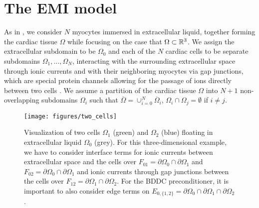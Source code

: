 \section{The EMI model} \label{sec:emi}
As in \cite{2D-proof}, we consider $N$ myocytes immersed in extracellular liquid, together forming the cardiac tissue $\Omega$ while focusing on the case that $\Omega \subset \mathbb{R}^3$. We assign the extracellular subdomain to be $\Omega_0$ and each of the $N$ cardiac cells to be separate subdomains $\Omega_1,\dots,\Omega_N$, interacting with the surrounding extracellular space through ionic currents and with their neighboring myocytes via gap junctions, which are special protein channels allowing for the passage of ions directly between two cells \cite{ionic}. We assume a partition of the cardiac tissue $\Omega$ into $N + 1$ non-overlapping subdomains $\Omega_i$ such that $\overline \Omega = \cup_{i = 0}^N \overline \Omega_i$, $\Omega_i \cap \Omega_j = \emptyset$ if $i \neq j$.

\begin{figure}
    \centering
    \texttt{[image: figures/two\_cells]}
    \caption{Visualization of two cells $\Omega_1$ (green) and $\Omega_2$ (blue) floating in extracellular liquid $\Omega_0$ (grey). For this three-dimensional example, we have to consider interface terms for ionic currents between extracellular space and the cells over $F_{01} = \partial\Omega_0 \cap \partial\Omega_1$ and $F_{02} = \partial \Omega_0 \cap \partial \Omega_1$ and ionic currents through gap junctions between the cells over $F_{12} = \partial\Omega_1\cap\partial\Omega_2$. For the BDDC preconditioner, it is important to also consider edge terms on $E_{0, \{1, 2\}} = \partial\Omega_0\cap\partial\Omega_1\cap\partial\Omega_2$.}
    \label{fig:two_cells}
\end{figure}


